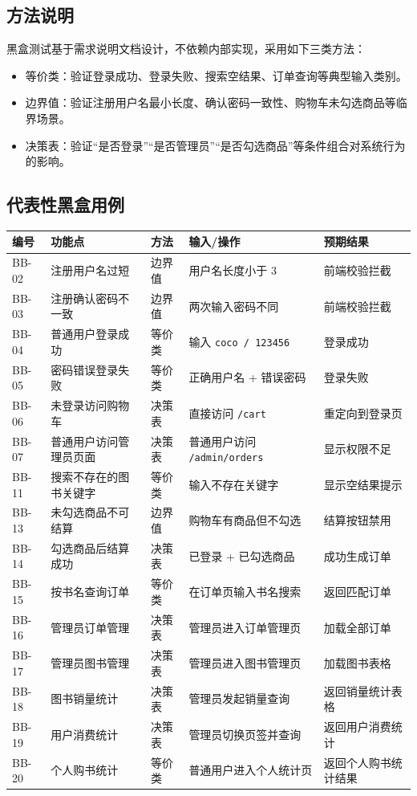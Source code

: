 \documentclass[UTF8,a4paper,12pt]{ctexart}
\begin{document}
\subsection{方法说明}

黑盒测试基于需求说明文档设计，不依赖内部实现，采用如下三类方法：

\begin{itemize}
  \item 等价类：验证登录成功、登录失败、搜索空结果、订单查询等典型输入类别。
  \item 边界值：验证注册用户名最小长度、确认密码一致性、购物车未勾选商品等临界场景。
  \item 决策表：验证“是否登录”“是否管理员”“是否勾选商品”等条件组合对系统行为的影响。
\end{itemize}

\subsection{代表性黑盒用例}

\begin{longtable}{p{1.8cm}p{3.5cm}p{2.3cm}p{4cm}p{4cm}}
\toprule
编号 & 功能点 & 方法 & 输入/操作 & 预期结果 \\
\midrule
BB-02 & 注册用户名过短 & 边界值 & 用户名长度小于 3 & 前端校验拦截 \\
BB-03 & 注册确认密码不一致 & 边界值 & 两次输入密码不同 & 前端校验拦截 \\
BB-04 & 普通用户登录成功 & 等价类 & 输入 \texttt{coco / 123456} & 登录成功 \\
BB-05 & 密码错误登录失败 & 等价类 & 正确用户名 + 错误密码 & 登录失败 \\
BB-06 & 未登录访问购物车 & 决策表 & 直接访问 \texttt{/cart} & 重定向到登录页 \\
BB-07 & 普通用户访问管理员页面 & 决策表 & 普通用户访问 \texttt{/admin/orders} & 显示权限不足 \\
BB-11 & 搜索不存在的图书关键字 & 等价类 & 输入不存在关键字 & 显示空结果提示 \\
BB-13 & 未勾选商品不可结算 & 边界值 & 购物车有商品但不勾选 & 结算按钮禁用 \\
BB-14 & 勾选商品后结算成功 & 决策表 & 已登录 + 已勾选商品 & 成功生成订单 \\
BB-15 & 按书名查询订单 & 等价类 & 在订单页输入书名搜索 & 返回匹配订单 \\
BB-16 & 管理员订单管理 & 决策表 & 管理员进入订单管理页 & 加载全部订单 \\
BB-17 & 管理员图书管理 & 决策表 & 管理员进入图书管理页 & 加载图书表格 \\
BB-18 & 图书销量统计 & 决策表 & 管理员发起销量查询 & 返回销量统计表格 \\
BB-19 & 用户消费统计 & 决策表 & 管理员切换页签并查询 & 返回用户消费统计 \\
BB-20 & 个人购书统计 & 等价类 & 普通用户进入个人统计页 & 返回个人购书统计结果 \\
\bottomrule
\end{longtable}
\end{document}
